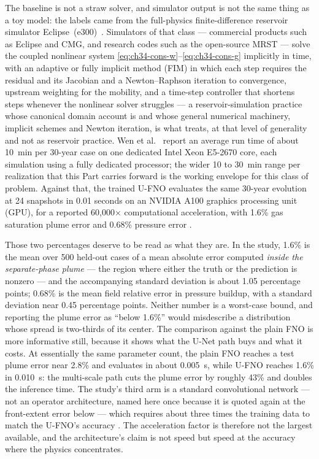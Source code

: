 The baseline is not a straw solver, and simulator output is not the same thing as a
toy model: the labels came from the full-physics finite-difference reservoir simulator
Eclipse~(e300)~\cite{wen2022ufno}. Simulators of that class --- commercial products such
as Eclipse and CMG, and research codes such as the open-source MRST --- solve the coupled nonlinear system
\eqref{eq:ch34-cons-w}--\eqref{eq:ch34-cons-g} implicitly in time, with an
adaptive or fully implicit method (FIM) in which each step requires the residual
and its Jacobian and a Newton--Raphson iteration to convergence, upstream weighting
for the mobility, and a time-step controller that shortens steps whenever the
nonlinear solver struggles --- a reservoir-simulation practice whose canonical
domain account is \cite{peaceman1977fundamentals} and whose general numerical
machinery, implicit schemes and Newton iteration, is what \cite{quarteroni2008numerical}
treats, at that level of generality and not as reservoir practice. Wen et
al.~\cite{wen2022ufno} report an average run time of about 10~min per
30-year case on one dedicated Intel Xeon E5-2670 core, each simulation using a
fully dedicated processor; the wider 10 to 30~min range per realization that this Part
carries forward is the working envelope for this class of problem. Against that, the trained U-FNO evaluates the same 30-year
evolution at 24 snapshots in 0.01 seconds on an NVIDIA A100 graphics processing
unit (GPU), for a reported 60,000$\times$ computational acceleration, with 1.6\%
gas saturation plume error and 0.68\% pressure error \cite{wen2022ufno}.

Those two percentages deserve to be read as what they are. In the study, 1.6\% is
the mean over 500 held-out cases of a mean absolute error computed \emph{inside the
separate-phase plume} --- the region where either the truth or the prediction is
nonzero --- and the accompanying standard deviation is about 1.05 percentage points;
0.68\% is the mean field relative error in pressure buildup, with a standard
deviation near 0.45 percentage points. Neither number is a worst-case bound, and reporting the
plume error as ``below 1.6\%'' would misdescribe a distribution whose spread is
two-thirds of its center. The comparison against the plain FNO is more
informative still, because it shows what the U-Net path buys and what it costs. At
essentially the same parameter count, the plain FNO reaches a test plume error near
2.8\% and evaluates in about 0.005~s, while U-FNO reaches 1.6\% in 0.010~s: the
multi-scale path cuts the plume error by roughly 43\% and doubles the inference
time. The study's third arm is a standard convolutional network --- not an operator
architecture, named here once because it is quoted again at the front-extent error
below --- which requires about three times the training data
to match the U-FNO's accuracy \cite{wen2022ufno}. The acceleration factor is
therefore not the largest available, and the architecture's claim is not speed but
speed at the accuracy where the physics concentrates.

